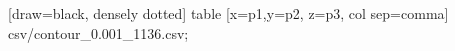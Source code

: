   [draw=black, densely dotted] table [x=p1,y=p2, z=p3, col sep=comma] {csv/contour_0.001_1136.csv}; 

